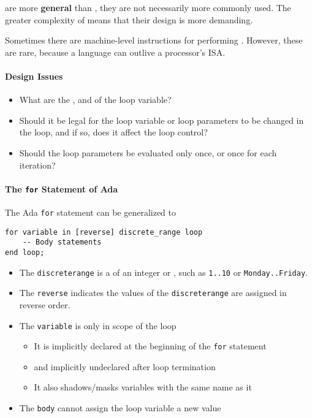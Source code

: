  are more \textbf{general} than , they are not necessarily more commonly used.
The greater complexity of  means that their design is more demanding.

\begin{remark*}
  Sometimes there are machine-level instructions for performing .
  However, these are rare, because a language can outlive a processor's ISA.\@
\end{remark*}

\paragraph{Design Issues}\label{par:Counter_Controlled_Loops-Design_Issues}
\begin{itemize}[noitemsep]
\item What are the , and  of the loop variable?
\item Should it be legal for the loop variable or loop parameters to be changed in the loop, and if so, does it affect the loop control?
\item Should the loop parameters be evaluated only once, or once for each iteration?
\end{itemize}

\paragraph{The \texttt{for} Statement of Ada}\label{par:Counter_Controlled_Loops-Ada}
The Ada \texttt{for} statement can be generalized to
\begin{verbatim}
for variable in [reverse] discrete_range loop
    -- Body statements
end loop;
\end{verbatim}
\begin{itemize}[noitemsep]
\item The \texttt{discrete\textunderscore{}range} is a  of an integer or , such as \texttt{1..10} or \texttt{Monday..Friday}.
\item The \texttt{reverse}  indicates the values of the \texttt{discrete\textunderscore{}range} are assigned in reverse order.
\item The \texttt{variable} is only in scope of the loop
  \begin{itemize}[noitemsep]
  \item It is implicitly declared at the beginning of the \texttt{for} statement
  \item and implicitly undeclared after loop termination
  \item It also shadows/masks variables with the same name as it
  \end{itemize}
\item The \texttt{body} cannot assign the loop variable a new value
\end{itemize}

